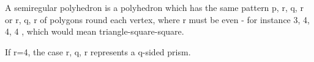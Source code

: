 A semiregular polyhedron is a polyhedron which has the same pattern
{p, r, q, r} or {r, q, r} of polygons round each vertex, where r must be even - 
for instance {3, 4, 4, 4} , which would mean triangle-square-square.
\par
If r=4, the case {r, q, r} represents a q-sided prism.
